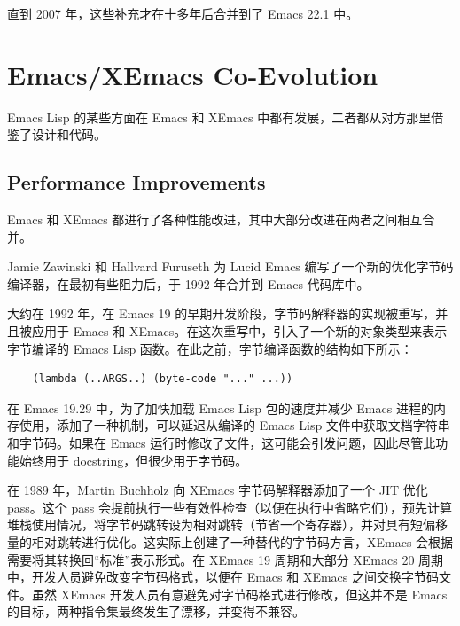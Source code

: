 \documentclass[format=acmsmall,screen]{acmart}
\begin{document}
直到 2007 年，这些补充才在十多年后合并到了 Emacs 22.1 中。

\section{Emacs/XEmacs Co-Evolution}
\label{sec:coevolution}

Emacs Lisp 的某些方面在 Emacs 和 XEmacs 中都有发展，二者都从对方那里借鉴了设计和代码。

\subsection{Performance Improvements}

Emacs 和 XEmacs 都进行了各种性能改进，其中大部分改进在两者之间相互合并。

Jamie Zawinski 和 Hallvard Furuseth 为 Lucid Emacs 编写了一个新的优化字节码编译器，在最初有些阻力后，于 1992 年合并到 Emacs 代码库中。


大约在 1992 年，在 Emacs 19 的早期开发阶段，字节码解释器的实现被重写，并且被应用于 Emacs 和 XEmacs。在这次重写中，引入了一个新的对象类型来表示字节编译的 Emacs Lisp 函数。在此之前，字节编译函数的结构如下所示：

\begin{verbatim}
    (lambda (..ARGS..) (byte-code "..." ...))
\end{verbatim}

在 Emacs 19.29 中，为了加快加载 Emacs Lisp 包的速度并减少 Emacs 进程的内存使用，添加了一种机制，可以延迟从编译的 Emacs Lisp 文件中获取文档字符串和字节码。如果在 Emacs 运行时修改了文件，这可能会引发问题，因此尽管此功能始终用于 docstring，但很少用于字节码。


在 1989 年，Martin Buchholz 向 XEmacs 字节码解释器添加了一个 JIT 优化 pass。这个 pass 会提前执行一些有效性检查（以便在执行中省略它们），预先计算堆栈使用情况，将字节码跳转设为相对跳转（节省一个寄存器），并对具有短偏移量的相对跳转进行优化。这实际上创建了一种替代的字节码方言，XEmacs 会根据需要将其转换回“标准”表示形式。在 XEmacs 19 周期和大部分 XEmacs 20 周期中，开发人员避免改变字节码格式，以便在 Emacs 和 XEmacs 之间交换字节码文件。虽然 XEmacs 开发人员有意避免对字节码格式进行修改，但这并不是 Emacs 的目标，两种指令集最终发生了漂移，并变得不兼容。
\end{document}
